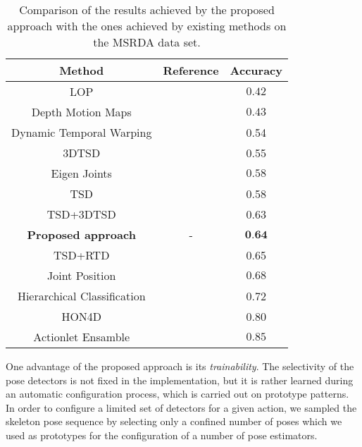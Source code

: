 \documentclass[runningheads,a4paper]{llncs}
\begin{document}
\begin{table}[!t]
	\begin{scriptsize}

\centering
\setlength\tabcolsep{0.2cm}
\renewcommand{\arraystretch}{1.3}
\begin{tabular}{|c|c|c|}
\hline 
\textbf{Method} & \textbf{Reference} & \textbf{Accuracy} \\
\hline  
LOP & \cite{Wu12_dataset} & $0.42$ \\
Depth Motion Maps & \cite{Yang12} & $0.43$ \\
Dynamic Temporal Warping & \cite{Muller06} & 0.54 \\
3DTSD & \cite{Koperski14} & 0.55 \\
Eigen Joints & \cite{Yang12_CVPR} & $0.58$ \\
TSD & \cite{Koperski14} & 0.58 \\
TSD+3DTSD & \cite{Koperski14} & 0.63 \\
\textbf{Proposed approach} & - & $\textbf{0.64}$ \\
TSD+RTD & \cite{Koperski14} & 0.65 \\
Joint Position & \cite{Wu12_dataset} & $0.68$ \\
Hierarchical Classification & \cite{Koperski14} & 0.72 \\
HON4D & \cite{Oreifej13} & 0.80 \\
Actionlet Ensamble & \cite{Wu12_dataset} & $0.85$ \\
\hline
\end{tabular}
\vspace{2mm}
\caption{Comparison of the results achieved by the proposed approach with the ones achieved by existing methods  on the MSRDA data set.}
	\label{tab:comparison_msrda}
		\end{scriptsize}
\end{table}


One advantage of the proposed approach is its \emph{trainability}. The selectivity of the pose detectors is not fixed in the implementation, but it is rather learned during an automatic configuration process, which is carried out on prototype patterns. 
In order to configure a limited set of detectors for a given action, we sampled the skeleton pose sequence by selecting only a confined number of poses which we used as prototypes for the configuration of a number of pose estimators. 
\end{document}
